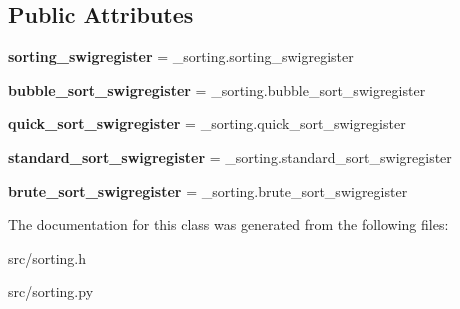 \subsection*{Public Attributes}
\begin{DoxyCompactItemize}
\item 
\hypertarget{classsorting_a4cc8da423268f92f163d7d4be24467d6}{
{\bfseries sorting\_\-swigregister} = \_\-sorting.sorting\_\-swigregister}
\label{df/d42/classsorting_a4cc8da423268f92f163d7d4be24467d6}

\item 
\hypertarget{classsorting_a84093d681eb3f394fb132983eb3abd09}{
{\bfseries bubble\_\-sort\_\-swigregister} = \_\-sorting.bubble\_\-sort\_\-swigregister}
\label{df/d42/classsorting_a84093d681eb3f394fb132983eb3abd09}

\item 
\hypertarget{classsorting_ab51d9e4b6596ebab6989ac6df926de1e}{
{\bfseries quick\_\-sort\_\-swigregister} = \_\-sorting.quick\_\-sort\_\-swigregister}
\label{df/d42/classsorting_ab51d9e4b6596ebab6989ac6df926de1e}

\item 
\hypertarget{classsorting_aef1ecd7d8db60fe2cfef725f65970a22}{
{\bfseries standard\_\-sort\_\-swigregister} = \_\-sorting.standard\_\-sort\_\-swigregister}
\label{df/d42/classsorting_aef1ecd7d8db60fe2cfef725f65970a22}

\item 
\hypertarget{classsorting_a498a3af6e106159779f2583ed3e26fb3}{
{\bfseries brute\_\-sort\_\-swigregister} = \_\-sorting.brute\_\-sort\_\-swigregister}
\label{df/d42/classsorting_a498a3af6e106159779f2583ed3e26fb3}

\end{DoxyCompactItemize}


The documentation for this class was generated from the following files:\begin{DoxyCompactItemize}
\item 
src/sorting.h\item 
src/sorting.py\end{DoxyCompactItemize}
